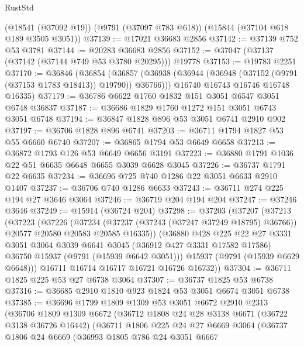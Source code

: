 \begin{lexlean}{RustStd}
\begin{coremodule}
    (@18541 (@37092 @19))
    (@9791 (@37097 @783 @618))
    (@15844 (@37104 @618 @189 @3505 @3051))
@37139 := @17021 @36683 @2856
@37142 := @37139 @752 @53 @3781
@37144 := @20283 @36683 @2856
@37152 := @37047 (@37137 (@37142 (@37144 @749 @53 @3780 @20295))) @19778
@37153 := @19783 @2251
@37170 := @36846
    (@36854
      (@36857 (@36938 (@36944 (@36948 (@37152 (@9791 (@37153 @1783 @18413)) @19790)) @36766)))
      @16740
      @16743
      @16746
      @16748
      @16335)
@37179 := @36786 @6622 @1760 @1832 @151 @3051 @6547 @3051 @6748 @36837
@37187 := @36686 @1829 @1760 @1272 @151 @3051 @6743 @3051 @6748
@37194 := @36847 @1828 @896 @53 @3051 @6741 @2910 @902
@37197 := @36706 @1828 @896 @6741
@37203 := @36711 @1794 @1827 @53 @55 @6660 @6740
@37207 := @36865 @1794 @53 @6649 @6658
@37213 := @36872 @1793 @126 @53 @6649 @6656 @3191
@37223 := @36880 @1791 @1036 @22 @51 @6635 @6648 @6655 @3039 @6628 @3045
@37226 := @36737 @1791 @22 @6635
@37234 := @36696 @725 @740 @1286 @22 @3051 @6633 @2910 @1407
@37237 := @36706 @740 @1286 @6633
@37243 := @36711 @274 @225 @194 @27 @3646 @3064
@37246 := @36719 @204 @194 @204
@37247 := @37246 @3646
@37249 := @15914 (@36724 @204)
@37298 := @37203
    (@37207
      (@37213
        (@37223
          (@37226
            (@37234
              (@37237 (@37243 (@37247 @37249 @18795) @36766))
              @20577
              @20580
              @20583
              @20585
              @16335))
          (@36880
            @428
            @225
            @22
            @27
            @3331
            @3051
            @3064
            @3039
            @6641
            @3045
            (@36912 @427 @3331 @17582 @17586)
            @36750
            @15937
            (@9791 (@15939 @6642 @3051)))
          @15937
          (@9791 (@15939 @6629 @6648)))
        @16711
        @16714
        @16717
        @16721
        @16726
        @16732))
@37304 := @36711 @1825 @225 @53 @27 @6738 @3064
@37307 := @36737 @1825 @53 @6738
@37316 := @36685 @2910 @1810 @923 @1824 @53 @3051 @6674 @3051 @6738
@37385 := @36696
    @1799
    @1809
    @1309
    @53
    @3051
    @6672
    @2910
    @2313
    (@36706
      @1809
      @1309
      @6672
      (@36712
        @1808
        @24
        @28
        @3138
        @6671
        (@36722 @3138 @36726 @16442)
        (@36711
          @1806
          @225
          @24
          @27
          @6669
          @3064
          (@36737
            @1806
            @24
            @6669
            (@36993
              @1805
              @786
              @24
              @3051
              @6667

\end{coremodule}
\end{lexlean}
